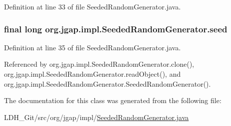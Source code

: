 Definition at line 33 of file Seeded\-Random\-Generator.\-java.

\hypertarget{classorg_1_1jgap_1_1impl_1_1_seeded_random_generator_ae7446837a948e934a4f9a284d485e698}{
\subsubsection[{seed}]{\setlength{\rightskip}{0pt plus 5cm}final long org.\-jgap.\-impl.\-Seeded\-Random\-Generator.\-seed\hspace{0.3cm}{\ttfamily [private]}}}\label{classorg_1_1jgap_1_1impl_1_1_seeded_random_generator_ae7446837a948e934a4f9a284d485e698}


Definition at line 35 of file Seeded\-Random\-Generator.\-java.



Referenced by org.\-jgap.\-impl.\-Seeded\-Random\-Generator.\-clone(), org.\-jgap.\-impl.\-Seeded\-Random\-Generator.\-read\-Object(), and org.\-jgap.\-impl.\-Seeded\-Random\-Generator.\-Seeded\-Random\-Generator().



The documentation for this class was generated from the following file\-:\begin{DoxyCompactItemize}
\item 
L\-D\-H\-\_\-\-Git/src/org/jgap/impl/\hyperlink{_seeded_random_generator_8java}{Seeded\-Random\-Generator.\-java}\end{DoxyCompactItemize}
